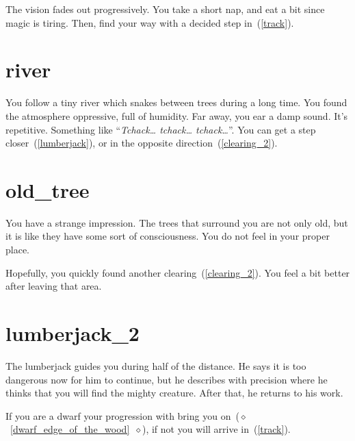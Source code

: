 The vision fades out progressively. You take a short nap, and eat a bit
since magic is tiring. Then, find your way with a decided step in~(\ref{track}).

\section{river}

You follow a tiny river which snakes between trees during a long time. You found
the atmosphere oppressive, full of humidity. Far away, you ear a damp sound.
It's repetitive. Something like ``\textit{Tchack… tchack… tchack…}''. You can
get a step closer~(\ref{lumberjack}), or in the opposite
direction~(\ref{clearing_2}).

\section{old_tree}

You have a strange impression. The trees that surround you are not only old, but
it is like they have some sort of consciousness. You do not feel in your proper
place.

Hopefully, you quickly found another clearing~(\ref{clearing_2}). You feel a bit
better after leaving that area.

\section{lumberjack_2}

The lumberjack guides you during half of the distance. He says it is too dangerous
now for him to continue, but he describes with precision where he thinks that you
will find the mighty creature. After that, he returns to his work.

If you are a dwarf your progression with bring you
on~($\diamond$~\ref{dwarf_edge_of_the_wood}~$\diamond$), if not you will arrive
in~(\ref{track}).
